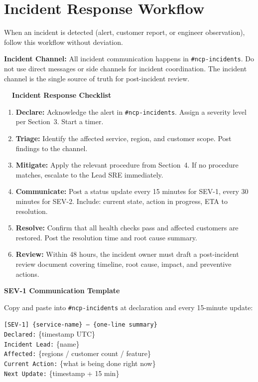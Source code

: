 \section{Incident Response Workflow}

When an incident is detected (alert, customer report, or engineer observation), follow this workflow without deviation.

\begin{infobox}
\textbf{Incident Channel:} All incident communication happens in \texttt{\#ncp-incidents}. Do not use direct messages or side channels for incident coordination. The incident channel is the single source of truth for post-incident review.
\end{infobox}

\medskip
\begin{stepbox}
\textbf{\faPlay\ \ Incident Response Checklist}\smallskip

\begin{enumerate}[leftmargin=*,itemsep=4pt]
  \item \textbf{Declare:} Acknowledge the alert in \texttt{\#ncp-incidents}. Assign a severity level per Section~3. Start a timer.
  \item \textbf{Triage:} Identify the affected service, region, and customer scope. Post findings to the channel.
  \item \textbf{Mitigate:} Apply the relevant procedure from Section~4. If no procedure matches, escalate to the Lead SRE immediately.
  \item \textbf{Communicate:} Post a status update every 15 minutes for SEV-1, every 30 minutes for SEV-2. Include: current state, action in progress, ETA to resolution.
  \item \textbf{Resolve:} Confirm that all health checks pass and affected customers are restored. Post the resolution time and root cause summary.
  \item \textbf{Review:} Within 48 hours, the incident owner must draft a post-incident review document covering timeline, root cause, impact, and preventive actions.
\end{enumerate}
\end{stepbox}

\begin{critbox}
\textbf{SEV-1 Communication Template}\smallskip

Copy and paste into \texttt{\#ncp-incidents} at declaration and every 15-minute update:\smallskip

\texttt{[SEV-1] \{service-name\} --- \{one-line summary\}}\\
\texttt{Declared:} \{timestamp UTC\}\\
\texttt{Incident Lead:} \{name\}\\
\texttt{Affected:} \{regions / customer count / feature\}\\
\texttt{Current Action:} \{what is being done right now\}\\
\texttt{Next Update:} \{timestamp + 15 min\}
\end{critbox}

